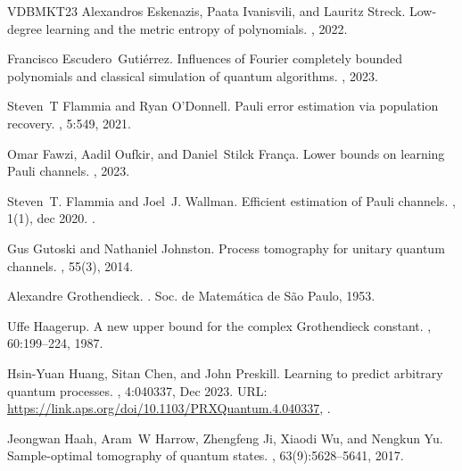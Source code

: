 \documentclass[11pt]{article}
\theoremstyle{plain}
\theoremstyle{plain}
\theoremstyle{definition}
\theoremstyle{remark}
\theoremstyle{named}
\begin{document}
\begin{thebibliography}{VDBMKT23}
Alexandros Eskenazis, Paata Ivanisvili, and Lauritz Streck.
\newblock Low-degree learning and the metric entropy of polynomials.
, 2022.

Francisco Escudero{\ }Guti{\'e}rrez.
\newblock Influences of {F}ourier completely bounded polynomials and classical
  simulation of quantum algorithms.
, 2023.

Steven~T Flammia and Ryan O'Donnell.
\newblock Pauli error estimation via population recovery.
, 5:549, 2021.

Omar Fawzi, Aadil Oufkir, and Daniel~Stilck Fran{\c{c}}a.
\newblock Lower bounds on learning {P}auli channels.
, 2023.

Steven~T. Flammia and Joel~J. Wallman.
\newblock Efficient estimation of {P}auli channels.
, 1(1), dec 2020.
\newblock \href {https://doi.org/10.1145/3408039} {}.

Gus Gutoski and Nathaniel Johnston.
\newblock Process tomography for unitary quantum channels.
, 55(3), 2014.

Alexandre Grothendieck.
.
\newblock Soc. de Matem{\'a}tica de S{\~a}o Paulo, 1953.

Uffe Haagerup.
\newblock A new upper bound for the complex {G}rothendieck constant.
, 60:199--224, 1987.

Hsin-Yuan Huang, Sitan Chen, and John Preskill.
\newblock Learning to predict arbitrary quantum processes.
, 4:040337, Dec 2023.
\newblock URL: \url{https://link.aps.org/doi/10.1103/PRXQuantum.4.040337},
  \href {https://doi.org/10.1103/PRXQuantum.4.040337}
  {}.

Jeongwan Haah, Aram~W Harrow, Zhengfeng Ji, Xiaodi Wu, and Nengkun Yu.
\newblock Sample-optimal tomography of quantum states.
, 63(9):5628--5641,
  2017.


\end{thebibliography}
\end{document}
